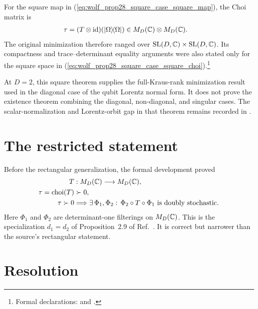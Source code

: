 \documentclass{article}
\begin{document}
For the square map in
(\ref{eq:wolf_prop28_square_case_square_map}), the Choi matrix is
\begin{align}
    \tau
        &=(T\otimes\operatorname{id})
          (|\Omega\rangle\!\langle \Omega|)
          \in M_{D}(\mathbb{C})\otimes M_{D}(\mathbb{C}).
    \label{eq:wolf_prop28_square_case_square_choi}
\end{align}
The original minimization therefore ranged over
$\operatorname{SL}(D,\mathbb{C})\times\operatorname{SL}(D,\mathbb{C})$. Its compactness and
trace--determinant equality arguments were also stated only for the square
space in (\ref{eq:wolf_prop28_square_case_square_choi}).\footnote{Formal
declarations:
 and
.}

At $D=2$, this square theorem supplies the full-Kraus-rank minimization result
used in the diagonal case of the qubit Lorentz normal form. It does not prove
the existence theorem combining the diagonal, non-diagonal, and singular
cases. The scalar-normalization and Lorentz-orbit gap in that theorem remains
recorded in
.

\section{The restricted statement}

Before the rectangular generalization, the formal development proved
\begin{align}
    T&:M_{D}(\mathbb{C})\longrightarrow M_{D}(\mathbb{C}),
    \label{eq:wolf_prop28_square_case_restricted_domain}\\
    \tau=\operatorname{choi}(T)&\succ0,
    \label{eq:wolf_prop28_square_case_positive_choi}\\
    \tau\succ0
        &\Longrightarrow
          \exists\,\Phi_1,\Phi_2:\,
          \Phi_2\circ T\circ\Phi_1
          \text{ is doubly stochastic}.
    \label{eq:wolf_prop28_square_case_restricted_conclusion}
\end{align}
Here $\Phi_1$ and $\Phi_2$ are determinant-one filterings on $M_{D}(\mathbb{C})$. This
is the specialization $d_1=d_2$ of Proposition~2.9 of
Ref.~\cite{Wolf2012Quantum}. It is correct but narrower than the source's
rectangular statement.

\section{Resolution}
\end{document}
